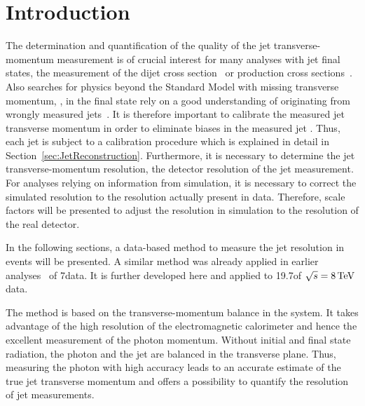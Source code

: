 \chapter{Introduction}
\label{res:ch:Introduction}
The determination and quantification of the quality of the jet transverse-momentum measurement is of crucial interest for many analyses with jet final states, \eg the measurement of the dijet cross section~\cite{bib:CMS:QCD_measurements} or \ttbar production cross sections~\cite{bib:CMS:TopCrossSection_8TeV}. 
Also searches for physics beyond the Standard Model with missing transverse momentum, \PTm, in the final state rely on a good understanding of \PTm originating from wrongly measured jets~\cite{bib:CMS:RA2_8TeV,bib:CMS:MT2_8TeV,bib:CMS:AlphaT_8TeV}.
It is therefore important to calibrate the measured jet transverse momentum in order to eliminate biases in the measured jet \pt.
Thus, each jet is subject to a calibration procedure which is explained in detail in Section~\ref{sec:JetReconstruction}.
Furthermore, it is necessary to determine the jet transverse-momentum resolution, \ie the detector resolution of the jet \pt measurement.
For analyses relying on information from simulation, it is necessary to correct the simulated resolution to the resolution actually present in data.
Therefore, scale factors will be presented to adjust the resolution in simulation to the resolution of the real detector.  
  
In the following sections, a data-based method to measure the jet \pt resolution in \GAMJET events will be presented. 
A similar method was already applied in earlier analyses~\cite{bib:CMS:JERCPaper_2011,CMS:PAS:JETResolution_7TeV} of 7\tev data.  
It is further developed here and applied to 19.7\fbinv of $\sqrt{s}=8\,\text{Te}\kern-0.06667em\text{V}$ data.

The method is based on the transverse-momentum balance in the \GAMJET system. 
It takes advantage of the high resolution of the electromagnetic calorimeter and hence the excellent measurement of the photon momentum.
Without initial and final state radiation, the photon and the jet are balanced in the transverse plane. 
Thus, measuring the photon \pt with high accuracy leads to an accurate estimate of the true jet transverse momentum and offers a possibility to quantify the resolution of jet \pt measurements.


